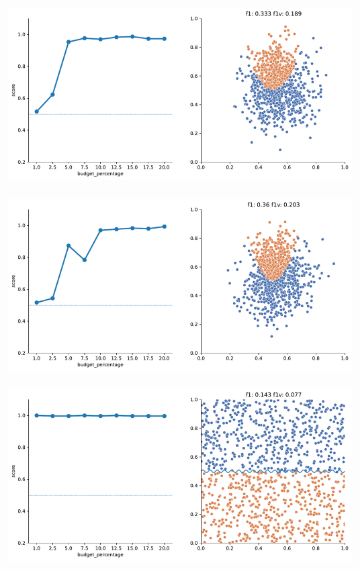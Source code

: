 \begin{figure}
\begin{subfigure}{.5\textwidth}
    \end{subfigure}
    \begin{subfigure}{.5\textwidth}
        \centering
        \includegraphics[width=\textwidth]{img/2d_v2/4.pdf}
    \end{subfigure}%
    \hfill
    \begin{subfigure}{.5\textwidth}
        \centering
        \includegraphics[width=\textwidth]{img/2d_v2/5.pdf}
    \end{subfigure}
    \begin{subfigure}{.5\textwidth}
        \centering
        \includegraphics[width=\textwidth]{img/2d_v2/6.pdf}

\end{subfigure}
\end{figure}
